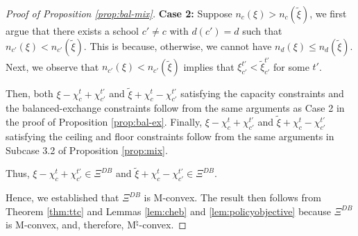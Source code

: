 \documentclass[12pt]{amsart}
\newtheorem{lemma}{Lemma}
\theoremstyle{remark}
\newcommand{\norm}[1]{|| #1 ||}
\newcommand{\mby}[1]{{\color{blue} MBY: #1 }}
\begin{document}
\begin{proof}[Proof of Proposition \ref{prop:bal-mix}]
\textbf{Case 2:} Suppose $n_c(\xi) > n_c(\tilde \xi)$, we first argue that there exists a school $c' \neq c$ with $d(c')=d$ such that $n_{c'}(\xi) < n_{c'}(\tilde \xi)$. This is because, otherwise, we cannot have $n_d(\xi) \leq n_d(\tilde \xi)$. Next, we observe that $n_{c'}(\xi) < n_{c'}(\tilde \xi)$ implies that $ \xi_{c'}^{t'} <  \tilde{\xi}_{c'}^{t'}$ for some $t'$.

Then, both $\xi-\chi_c^t+\chi_{c'}^{t'}$ and $\tilde{\xi}+\chi_c^t-\chi_{c'}^{t'}$ satisfying the capacity constraints and the balanced-exchange constraints follow
from the same arguments as Case 2 in the proof of Proposition \ref{prop:bal-ex}. Finally, $\xi-\chi_c^t+\chi_{c'}^{t'}$ and $\tilde{\xi}+\chi_c^t-\chi_{c'}^{t'}$ satisfying the ceiling and floor constraints follow from the same arguments in Subcase 3.2 of Proposition \ref{prop:mix}.

Thus, $\xi-\chi_c^t+\chi_{c'}^{t'} \in \Xi^{DB}$ and $\tilde{\xi}+\chi_c^t-\chi_{c'}^{t'}\in \Xi^{DB}$.

Hence, we established that $\Xi^{DB}$ is M-convex. The result then follows from Theorem \ref{thm:ttc} and Lemmas \ref{lem:cheb} and \ref{lem:policyobjective}
because $\Xi^{DB}$ is M-convex, and, therefore, M$^{\natural}$-convex.
\end{proof}

\begin{comment}

\mby{It may be possible to simplify our proofs using the following lemma.}

The following is equivalent to M$^{\natural}$-convexity. It allows us to check M$^{\natural}$-convexity in an easier way.

\begin{lemma}\label{lem:natalt}[\cite{murotashioura2018}, Proposition 3.1]
A set of distributions $\Xi$ is M$^{\natural}$\textbf{-convex} if and only if, for each $\xi,\tilde{\xi} \in \Xi$,
\begin{enumerate}[(i)]
\item $\norm{\xi}>\norm{\tilde \xi}$ implies that there exists $(c,t) \in \calc \times \calt$ with $\xi_c^t>\tilde{\xi}_c^t$ such that $\xi-\chi_{c,t} \in \Xi$ and $\tilde{\xi}+\chi_{c,t} \in \Xi$, and
\item $\norm{\xi}=\norm{\tilde \xi}$ implies that for each $(c,t) \in \calc \times \calt$ with $\xi_c^t>\tilde{\xi}_c^t$, there exists $(c',t') \in \calc \times \calt$ with  $\xi_{c'}^{t'}<\tilde{\xi}_{c'}^{t'}$ such that
\[\xi-\chi_{c,t}+\chi_{c',t'}\in \Xi \; \mbox{ and } \; \tilde{\xi}+\chi_{c,t}-\chi_{c',t'} \in \Xi.\]
\end{enumerate}
\end{lemma}

\end{comment}
\end{document}
